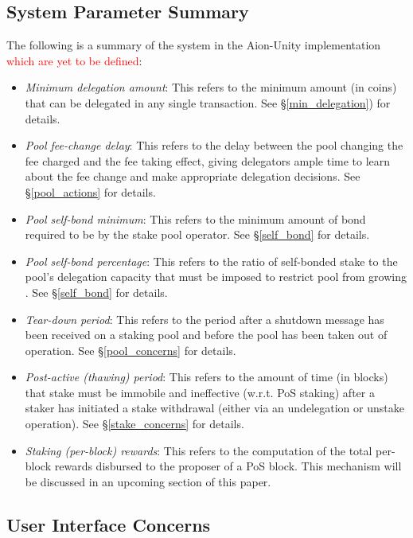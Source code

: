 \subsection{System Parameter Summary} \label{unspecified_parameters}
The following is a summary of the system in the Aion-Unity implementation \textcolor{red}{which are yet to be defined}: 
\begin{itemize}
    \item \textit{Minimum delegation amount}: This refers to the minimum amount (in coins) that can be delegated in any single transaction. See \S\ref{min_delegation}) for details.
    \item \textit{Pool fee-change delay}: This refers to the delay between the pool changing the fee charged and the fee taking effect, giving delegators ample time to learn about the fee change and make appropriate delegation decisions. See \S\ref{pool_actions} for details.
    \item \textit{Pool self-bond minimum}: This refers to the minimum amount of bond required to be  by the stake pool operator. See \S\ref{self_bond} for details.
    \item \textit{Pool self-bond percentage}: This refers to the ratio of self-bonded stake to the pool's delegation capacity that must be imposed to restrict pool from growing . See \S\ref{self_bond} for details.
    \item \textit{Tear-down period}: This refers to the period after a shutdown message has been received on a staking pool and before the pool has been taken out of operation. See \S\ref{pool_concerns} for details.
    \item \textit{Post-active (thawing) period}: This refers to the amount of time (in blocks) that stake must be immobile and ineffective (w.r.t. PoS staking) after a staker has initiated a stake withdrawal (either via an undelegation or unstake operation). See \S\ref{stake_concerns} for details. 
    \item \textit{Staking (per-block) rewards}: This refers to the computation of the total per-block rewards disbursed to the proposer of a PoS block. This mechanism will be discussed in an upcoming section of this paper. 
\end{itemize}

\subsection{User Interface Concerns} \label{ads_ui}

